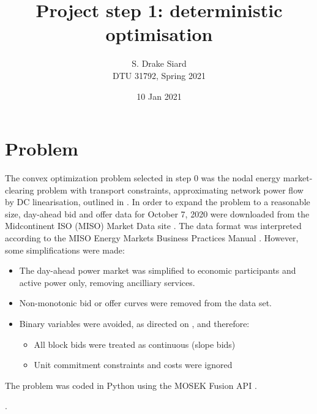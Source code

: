 \documentclass[11pt,a4paper]{article}
\title{\textbf{Project step 1: deterministic optimisation}}
\author{S. Drake Siard\\
DTU 31792, Spring 2021}
\date{10 Jan 2021}
\begin{document}
\maketitle

\section{Problem}

The convex optimization problem selected in step 0 was the nodal energy market-clearing problem with transport constraints, approximating network power flow by DC linearisation, outlined in \cite{kazempourLectureMarketClearing2021}.
In order to expand the problem to a reasonable size, day-ahead bid and offer data for October 7, 2020 were downloaded from the Midcontinent ISO (MISO) Market Data site \cite{MISOMarketData}.
The data format was interpreted according to the MISO Energy Markets Business Practices Manual \cite{MISOEnergyOperating2020}. However, some simplifications were made:
\begin{itemize}
\item The day-ahead power market was simplified to economic participants and active power only, removing ancilliary services.
\item Non-monotonic bid or offer curves were removed from the data set.
\item Binary variables were avoided, as directed on \cite[p. 14]{kazempourLectureMarketClearing2021}, and therefore: 
\begin{itemize}
\item All block bids were treated as continuous (slope bids)
\item Unit commitment constraints and costs were ignored
\end{itemize}
\end{itemize}


The problem was coded in Python using the MOSEK Fusion API \cite{mosekapsMOSEKFusionAPI2021}.



\renewcommand{\refname}{\section{References}}.

\end{document}
